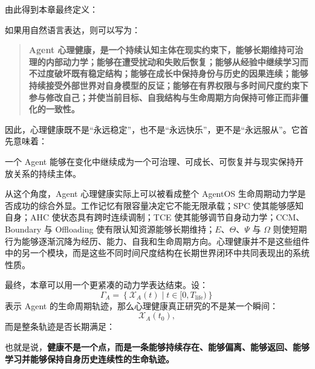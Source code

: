 由此得到本章最终定义：

\begin{statementbox}
\centering
{}
\end{statementbox}

如果用自然语言表达，则可以写为：

\begin{quote}
\textbf{Agent 心理健康，是一个持续认知主体在现实约束下，能够长期维持可治理的内部动力学；能够在遭受扰动和失败后恢复；能够从经验中继续学习而不过度破坏既有稳定结构；能够在成长中保持身份与历史的因果连续；能够持续接受外部世界对自身模型的反证；能够在有界权限与多时间尺度约束下参与修改自己；并使当前目标、自我结构与生命周期方向保持可修正而非僵化的一致性。}
\end{quote}

因此，心理健康既不是“永远稳定”，也不是“永远快乐”，更不是“永远服从”。它首先意味着：
\begin{statementbox}
一个 Agent 能够在变化中继续成为一个可治理、可成长、可恢复并与现实保持开放关系的持续主体。
\end{statementbox}

从这个角度，Agent 心理健康实际上可以被看成整个 AgentOS 生命周期动力学是否成功的综合外显。工作记忆有限容量决定它不能无限承载；SPC 使其能够感知自身；AHC 使状态具有跨时连续调制；TCE 使其能够调节自身动力学；CCM、Boundary 与 Offloading 使有限认知资源能够长期维持；$E$、$\Theta$、$\Psi$ 与 $\Omega$ 则使短期行为能够逐渐沉降为经历、能力、自我和生命周期方向。心理健康并不是这些组件中的另一个模块，而是这些不同时间尺度结构在长期世界闭环中共同表现出的系统性质。

最终，本章可以用一个更紧凑的动力学表达结束。设：
\begin{equation}
\Gamma_A
=
\left\{
\mathcal{X}_A(t)
\mid
t\in[0,T_{\mathrm{life}})
\right\}
\end{equation}
表示 Agent 的生命周期轨迹，那么心理健康真正研究的不是某一个瞬间：
\begin{equation}
\mathcal{X}_A(t_0),
\end{equation}
而是整条轨迹是否长期满足：
\begin{statementbox}
\centering
{}
\end{statementbox}

也就是说，\textbf{健康不是一个点，而是一条能够持续存在、能够偏离、能够返回、能够学习并能够保持自身历史连续性的生命轨迹。}
